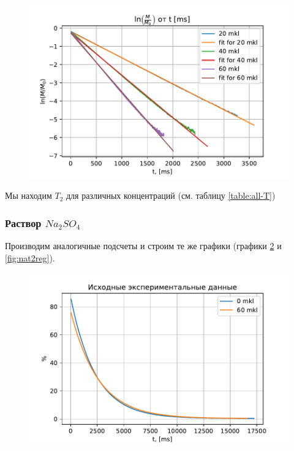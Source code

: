 \begin{figure}[!h]
	\hspace{-5em}
	\includegraphics[width=1.2\linewidth]{data/Mn_T_2_reg}
	\caption{}
	\label{fig:mnt2reg}
\end{figure}

Мы находим $ T_2 $ для различных концентраций (см. таблицу \ref{table:all-T})

\subsubsection{Раствор $Na_2 SO_4$}
Производим аналогичные подсчеты и строим те же графики (графики \ref{fig:nat2exper} и \ref{fig:nat2reg}).

\begin{figure}[!h]
	\hspace{-5em}
	\includegraphics[width=1.2\linewidth]{data/Na_T_2_exper}
	\caption{}
	\label{fig:nat2exper}
\end{figure}

